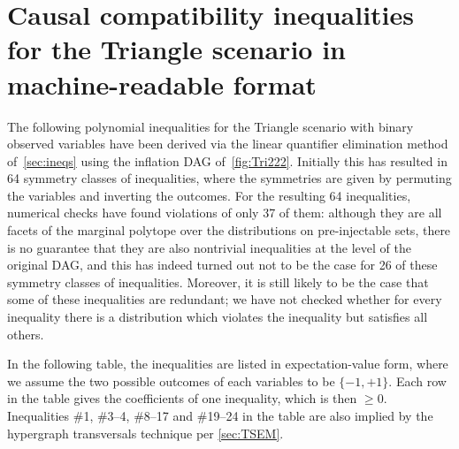 \documentclass[aps,english,superscriptaddress,onecolumn,twoside,longbibliography,pra,floatfix,fleqn,nofootinbib]{revtex4-1}%
\theoremstyle{definition}
\begin{document}
\section{Causal compatibility inequalities for the Triangle scenario in machine-readable format}
\label{sec:38ineqs}

The following polynomial inequalities for the Triangle scenario with binary observed variables have been derived via the linear quantifier elimination method of~\cref{sec:ineqs} using the inflation DAG of~\cref{fig:Tri222}. Initially this has resulted in 64 symmetry classes of inequalities, where the symmetries are given by permuting the variables and inverting the outcomes. For the resulting 64 inequalities, numerical checks have found violations of only 37 of them: although they are all facets of the marginal polytope over the distributions on pre-injectable sets, there is no guarantee that they are also nontrivial inequalities at the level of the original DAG, and this has indeed turned out not to be the case for 26 of these symmetry classes of inequalities. Moreover, it is still likely to be the case that some of these inequalities are redundant; we have not checked whether for every inequality there is a distribution which violates the inequality but satisfies all others.

In the following table, the inequalities are listed in expectation-value form, where we assume the two possible outcomes of each variables to be $\{-1,+1\}$. Each row in the table gives the coefficients of one inequality, which is then $\geq 0$. Inequalities \#1, \#3--4, \#8--17 and \#19--24 in the table are also implied by the hypergraph transversals technique per \cref{sec:TSEM}.
\end{document}
